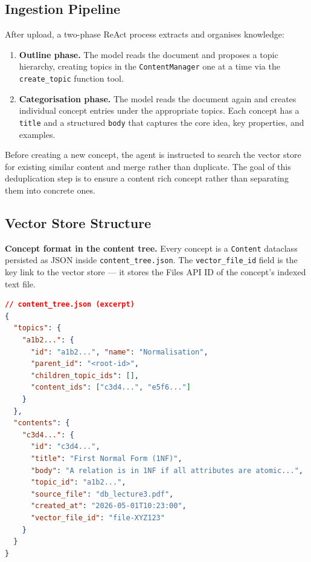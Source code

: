 \documentclass[12pt,a4paper]{article}
\begin{document}
\subsection{Ingestion Pipeline}

After upload, a two-phase ReAct process extracts and organises knowledge:

\begin{enumerate}[leftmargin=*]
  \item \textbf{Outline phase.} The model reads the document and proposes a
        topic hierarchy, creating topics in the \texttt{ContentManager}
        one at a time via the \texttt{create\_topic} function tool.
  \item \textbf{Categorisation phase.} The model reads the document again
        and creates individual concept entries under the appropriate topics.
        Each concept has a \texttt{title} and a structured \texttt{body}
        that captures the core idea, key properties, and examples.
\end{enumerate}

Before creating a new concept, the agent is instructed to search the vector store for existing similar content and merge rather than duplicate. The goal of this deduplication step is to ensure a content rich concept rather than separating them into concrete ones.

\subsection{Vector Store Structure}

\textbf{Concept format in the content tree.}
Every concept is a \texttt{Content} dataclass persisted as JSON inside \texttt{content\_tree.json}.
The \texttt{vector\_file\_id} field is the key link to the vector store --- it stores the Files API ID of the concept's indexed text file.

\begin{lstlisting}[language=json,numbers=none]
// content_tree.json (excerpt)
{
  "topics": {
    "a1b2...": {
      "id": "a1b2...", "name": "Normalisation",
      "parent_id": "<root-id>",
      "children_topic_ids": [],
      "content_ids": ["c3d4...", "e5f6..."]
    }
  },
  "contents": {
    "c3d4...": {
      "id": "c3d4...",
      "title": "First Normal Form (1NF)",
      "body": "A relation is in 1NF if all attributes are atomic...",
      "topic_id": "a1b2...",
      "source_file": "db_lecture3.pdf",
      "created_at": "2026-05-01T10:23:00",
      "vector_file_id": "file-XYZ123"
    }
  }
}
\end{lstlisting}
\end{document}
